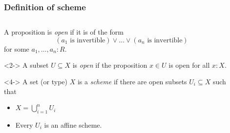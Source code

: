 \documentclass[aspectratio=1610]{beamer}
\begin{document}
\begin{frame}
  \frametitle{Definition of scheme}

  \begin{columns}
    \begin{column}{0.5\textwidth}
      \begin{definition}
        A proposition is \emph{open} if it is of the form
        \[ (\text{$a_1$ is invertible}) \lor \dots \lor (\text{$a_n$ is invertible}) \]
        for some $a_1, \dots, a_n : R$.
      \end{definition}

      \begin{definition}<2->
        A subset $U \subseteq X$ is \emph{open} if the proposition $x \in U$ is open for all $x : X$.
      \end{definition}

      \begin{definition}<4->
        A set (or type) $X$ is a \emph{scheme} if there are open subsets $U_i \subseteq X$ such that
        \begin{itemize}
          \item
            $X = \bigcup_{i=1}^n U_i$
          \item
            Every $U_i$ is an affine scheme.
        \end{itemize}
      \end{definition}
    \end{column}

    \begin{column}{0.5\textwidth}


\end{column}
\end{columns}
\end{frame}
\end{document}
